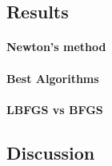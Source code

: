 \subsection{Results}
\paragraph{Newton's method}
\paragraph{Best Algorithms}
\paragraph{LBFGS vs BFGS}

\subsection{Discussion}
